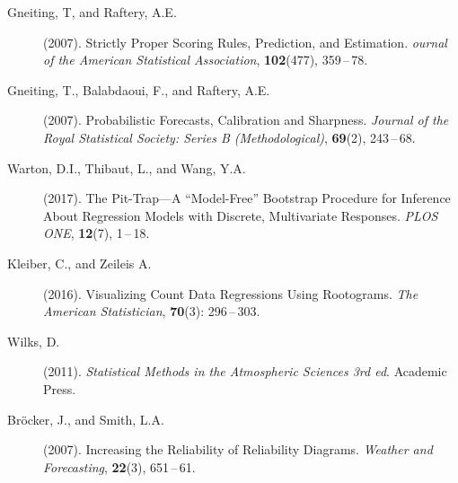 \documentclass[twoside]{report}
\begin{document}
\begin{description}
\item[Gneiting, T, and Raftery, A.E.] (2007).
    Strictly Proper Scoring Rules, Prediction, and Estimation.
    {\it ournal of the American Statistical Association},
    {\bf 102}(477), 359\,--\,78.
\item[Gneiting, T., Balabdaoui, F., and Raftery, A.E.] (2007).
    Probabilistic Forecasts, Calibration and Sharpness.
    {\it Journal of the Royal Statistical Society: Series B (Methodological)},
    {\bf 69}(2), 243\,--\,68.
\item [Warton, D.I., Thibaut, L., and Wang, Y.A.] (2017).
    The Pit-Trap---{A} ``Model-Free'' Bootstrap Procedure for Inference About
    Regression Models with Discrete, Multivariate Responses.
    {\it PLOS ONE},
    {\bf 12}(7), 1\,--\,18.
\item [Kleiber, C., and Zeileis A.] (2016).
    Visualizing Count Data Regressions Using Rootograms.
    {\it The American Statistician},
    {\bf 70}(3): 296\,--\,303.
\item [Wilks, D.] (2011).
    {\it Statistical Methods in the Atmospheric Sciences 3rd ed}.
    Academic Press.
\item [Bröcker, J., and Smith, L.A.] (2007).
    Increasing the Reliability of Reliability Diagrams.
    {\it Weather and Forecasting},
    {\bf 22}(3), 651\,--\,61.
\end{description}
\end{document}
